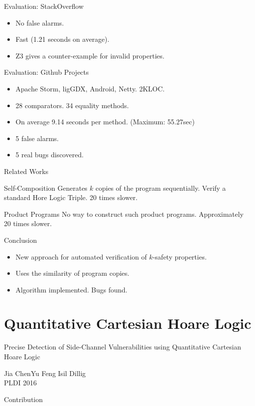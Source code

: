 \documentclass[page number]{beamer}
\begin{document}
\begin{frame}{Evaluation: StackOverflow}
  \begin{itemize}
  \item No false alarms.
  \item Fast (1.21 seconds on average).
  \item Z3 gives a counter-example for invalid properties.
  \end{itemize}
\end{frame}

\begin{frame}{Evaluation: Github Projects}
  \begin{itemize}
  \item Apache Storm, ligGDX, Android, Netty. 2KLOC.
  \item  28 comparators. 34 equality methods.
  \item On average 9.14 seconds per method. (Maximum: 55.27sec)
  \item 5 false alarms.
  \item 5 real bugs discovered.
  \end{itemize}
\end{frame}

\begin{frame}{Related Works}
  \begin{block}{Self-Composition}
    Generates $k$ copies of the program sequentially. Verify a standard Hore Logic Triple. 20 times slower.
  \end{block}
  \vfill
  \begin{block}{Product Programs}
    No way to construct such product programs.
    Approximately 20 times slower.
  \end{block}
\end{frame}

\begin{frame}{Conclusion}
  \begin{itemize}
  \item New approach for automated verification of $k$-safety properties.
  \item Uses the similarity of program copies.
  \item Algorithm implemented. Bugs found.
  \end{itemize}
\end{frame}

\section{Quantitative Cartesian Hoare Logic}
\begin{frame}{Precise Detection of Side-Channel Vulnerabilities using Quantitative Cartesian Hoare Logic}
  \begin{center}
    Jia Chen\qquad Yu Feng \qquad Isil Dillig\\
    PLDI 2016
  \end{center}
  \vfill
  \begin{exampleblock}{Contribution}
  \end{exampleblock}
\end{frame}
\end{document}
